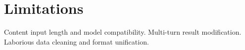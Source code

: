 \section*{Limitations}

Content input length and model compatibility.
Multi-turn result modification.
Laborious data cleaning and format unification.

